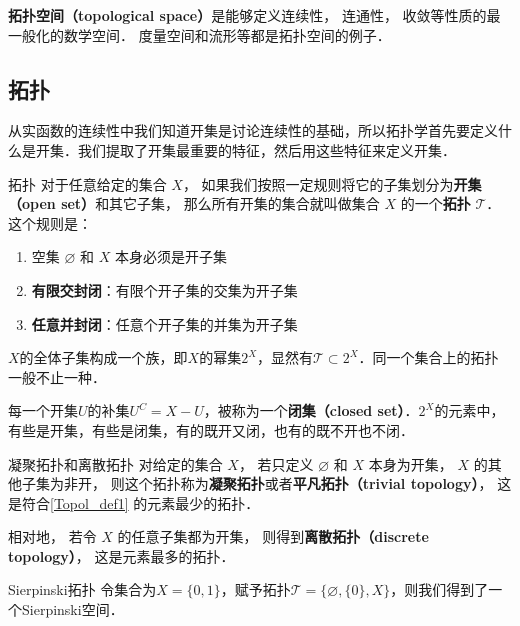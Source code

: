 

\textbf{拓扑空间（topological space）}是能够定义连续性， 连通性， 收敛等性质的最一般化的数学空间． 度量空间和流形等都是拓扑空间的例子．

\subsection{拓扑}

从实函数的连续性中我们知道开集是讨论连续性的基础，所以拓扑学首先要定义什么是开集．我们提取了开集最重要的特征，然后用这些特征来定义开集．

\begin{definition}{拓扑}\label{Topol_def1}
对于任意给定的集合 $X$， 如果我们按照一定规则将它的子集划分为\textbf{开集（open set）}和其它子集， 那么所有开集的集合就叫做集合 $X$ 的一个\textbf{拓扑} $\mathcal{T}$． 这个规则是：
\begin{enumerate}
\item 空集 $\varnothing$ 和 $X$ 本身必须是开子集
\item \textbf{有限交封闭}：有限个开子集的交集为开子集
\item \textbf{任意并封闭}：任意个开子集的并集为开子集
\end{enumerate}
\end{definition}

$X$的全体子集构成一个族，即$X$的幂集$2^X$，显然有$\mathcal{T}\subset2^X$．同一个集合上的拓扑一般不止一种．

每一个开集$U$的补集$U^C=X-U$，被称为一个\textbf{闭集（closed set）}．$2^X$的元素中，有些是开集，有些是闭集，有的既开又闭，也有的既不开也不闭．

\begin{example}{凝聚拓扑和离散拓扑}
对给定的集合 $X$， 若只定义 $\varnothing$ 和 $X$ 本身为开集， $X$ 的其他子集为非开， 则这个拓扑称为\textbf{凝聚拓扑}或者\textbf{平凡拓扑（trivial topology）}， 这是符合\autoref{Topol_def1} 的元素最少的拓扑．

相对地， 若令 $X$ 的任意子集都为开集， 则得到\textbf{离散拓扑（discrete topology）}， 这是元素最多的拓扑．
\end{example}

\begin{example}{Sierpinski拓扑}
令集合为$X=\{0, 1\}$，赋予拓扑$\mathcal{T}=\{\varnothing, \{0\}, X\}$，则我们得到了一个Sierpinski空间．
\end{example}

